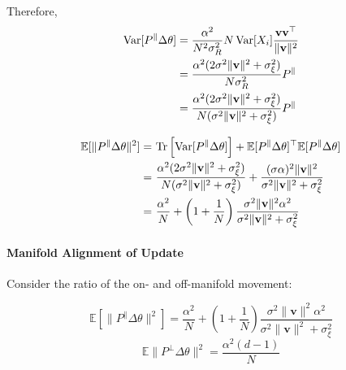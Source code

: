     Therefore,
    \begin{align}
    \mathrm{Var}[P^{\parallel}\Delta\theta] &= \frac{\alpha^{2}}{N^{2}\sigma_{R}^{2}}N\,\mathrm{Var}[X_{i}] \frac{\mathbf{v}\mathbf{v}^{\top}}{\|\mathbf{v}\|^{2}}
    \notag\\
    &= \frac{ \alpha^{2} (2\sigma^{2}\|\mathbf{v}\|^{2} + \sigma_{\xi}^{2}) }{ N \sigma_{R}^{2} } P^{\parallel} \notag\\
    &= \frac{ \alpha^{2} (2\sigma^{2}\|\mathbf{v}\|^{2} + \sigma_{\xi}^{2}) }{ N (\sigma^{2}\|\mathbf{v}\|^{2} + \sigma_{\xi}^{2}) } P^{\parallel}
    \end{align}
    
    \begin{align}
    \mathbb{E}[\|P^{\parallel}\Delta\theta\|^{2}] =&~ \mathrm{Tr}\left[\mathrm{Var}[P^{\parallel}\Delta\theta]\right] + \mathbb{E}[P^{\parallel}\Delta\theta]^{\top} \mathbb{E}[P^{\parallel}\Delta\theta] \notag\\
    =&~\frac{ \alpha^{2} (2\sigma^{2}\|\mathbf{v}\|^{2} + \sigma_{\xi}^{2}) }{ N ( \sigma^{2}\|\mathbf{v}\|^{2} + \sigma_{\xi}^{2} ) } + \frac{ (\sigma\alpha)^{2} \|\mathbf{v}\|^{2} }{ \sigma^{2}\|\mathbf{v}\|^{2} + \sigma_{\xi}^{2} } \notag\\
    =&~\frac{\alpha^{2}}{N} + \left(1 + \frac{1}{N}\right) \frac{ \sigma^{2}\|\mathbf{v}\|^{2} \alpha^{2} }{ \sigma^{2}\|\mathbf{v}\|^{2} + \sigma_{\xi}^{2} }
    \end{align}
    
    \paragraph{Manifold Alignment of Update}
    
    Consider the ratio of the on- and off-manifold movement:
    
    \begin{equation}
    \mathbb{E}\left[ \|P^{\parallel}\Delta\theta\|^{2} \right] = \frac{\alpha^{2}}{N} + \left( 1 + \frac{1}{N} \right) \frac{ \sigma^{2}\|\mathbf{v}\|^{2}\alpha^{2} }{ \sigma^{2}\|\mathbf{v}\|^{2} + \sigma_{\xi}^{2} }
    \end{equation}
    \begin{equation}
    \mathbb{E}\|P^{\perp}\Delta\theta\|^{2} = \frac{\alpha^{2}(d-1)}{N}
    \end{equation}
    
